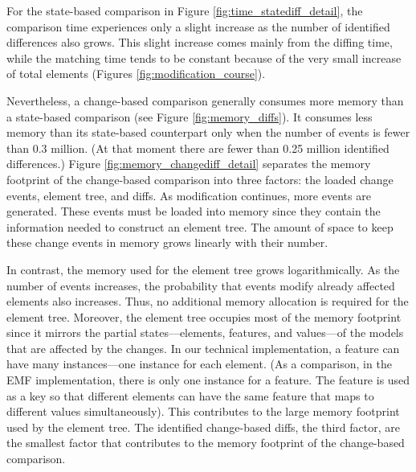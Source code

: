 For the state-based comparison in Figure \ref{fig:time_statediff_detail}, the comparison time experiences only a slight increase as the number of identified differences also grows.
This slight increase comes mainly from the diffing time, while the matching time tends to be constant because of the very small increase of total elements (Figures \ref{fig:modification_course}).

Nevertheless, a change-based comparison generally consumes more memory than a state-based comparison (see Figure \ref{fig:memory_diffs}). It consumes less memory than its state-based counterpart only when the number of events is fewer than 0.3 million. (At that moment there are fewer than 0.25 million identified differences.) Figure \ref{fig:memory_changediff_detail} separates the memory footprint of the change-based comparison into three factors: the loaded change events, element tree, and diffs. As modification continues, more events are generated. These events must be loaded into memory since they contain the information needed to construct an element tree. The amount of space to keep these change events in memory grows linearly with their number.

In contrast, the memory used for the element tree grows logarithmically. As the number of events increases, the probability that events modify already affected elements also increases. Thus, no additional memory allocation is required for the element tree. Moreover, the element tree occupies most of the memory footprint since it mirrors the partial states—elements, features, and values—of the models that are affected by the changes. In our technical implementation, a feature can have many instances—one instance for each element. (As a comparison, in the EMF implementation, there is only one instance for a feature. The feature is used as a key so that different elements can have the same feature that maps to different values simultaneously). This contributes to the large memory footprint used by the element tree. The identified change-based diffs, the third factor, are the smallest factor that contributes to the memory footprint of the change-based comparison.

